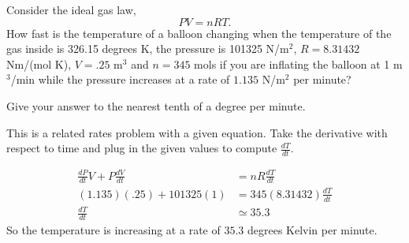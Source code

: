 \documentclass{ximera}
\author{Emma Smith Zbarsky}
\begin{document}
\begin{exercise}

Consider the ideal gas law, \[PV = nRT.\] How fast is the temperature of
a balloon changing when the temperature of the gas inside is 326.15
degrees K, the pressure is 101325 N/m$^2$, $R=8.31432$ Nm/(mol K),
$V=.25$ m$^3$ and $n=345$ mols if you are inflating the balloon at 1
m$^3$/min while the pressure increases at a rate of $1.135$ N/m$^2$ per
minute?

Give your answer to the nearest tenth of a degree per minute.


\begin{hint}
This is a related rates problem with a given equation. Take the
derivative with respect to time and plug in the given values to compute
$\frac{dT}{dt}$.
\end{hint}


\begin{hint}
\begin{align*}
\frac{dP}{dt}V + P\frac{dV}{dt} &= nR\frac{dT}{dt} \\
(1.135)(.25) + 101325(1) &= 345(8.31432) \frac{dT}{dt} \\
\frac{dT}{dt} &\simeq 35.3
\end{align*} So the temperature is increasing at a rate of $35.3$
degrees Kelvin per minute.
\end{hint}


\begin{multipleChoice}
\end{multipleChoice}

\end{exercise}
\end{document}
